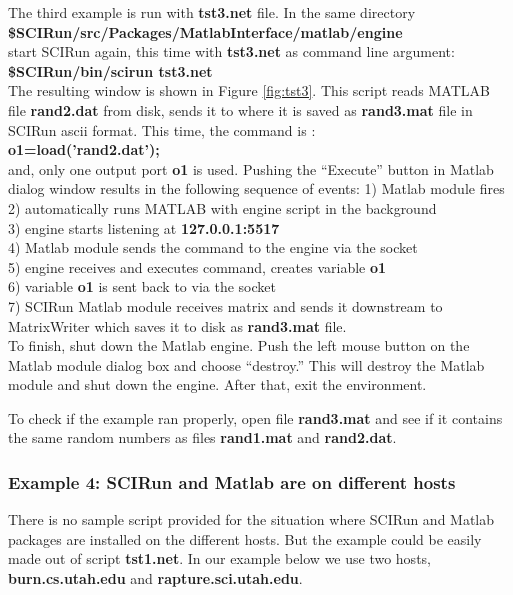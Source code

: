 The third example is run with {\bf tst3.net} file. In the same
directory \\
{\bf \$SCIRun/src/Packages/MatlabInterface/matlab/engine } \\
start SCIRun again, this time with {\bf tst3.net} as command line argument: \\
{\bf \$SCIRun/bin/scirun  tst3.net} \\
The resulting window is shown in Figure \ref{fig:tst3}. This
script reads MATLAB file {\bf rand2.dat} from disk, sends
it to \sr{} where it is saved as {\bf rand3.mat} file
in SCIRun ascii format. This time, the command is : \\
{\bf o1=load('rand2.dat');} \\
and, only one output port {\bf o1} is used. Pushing the
``Execute'' button in Matlab dialog window results in
the following sequence of events:
1) Matlab module fires \\
2) automatically runs MATLAB with engine script in the background  \\
3) engine starts listening at {\bf 127.0.0.1:5517} \\
4) Matlab module sends the command to the engine via the socket\\
5) engine receives and executes command, creates variable {\bf o1} \\
6) variable {\bf o1} is sent back to \sr{} via the socket \\
7) SCIRun Matlab module receives matrix and sends it downstream
   to MatrixWriter which saves it to disk as {\bf rand3.mat} file. \\

To finish, shut down the Matlab engine.
Push the left mouse button on the
Matlab module dialog box and choose ``destroy.'' This will destroy
the Matlab module and shut down the engine. After that, exit
the \sr{} environment.

To check if the example ran properly, open file {\bf rand3.mat}
and see if it contains the same random numbers as files {\bf rand1.mat}
and {\bf rand2.dat}.

\subsubsection{Example 4: SCIRun and Matlab are on different hosts} \indent

There is no sample script provided for the situation where SCIRun and
Matlab packages are installed on the different hosts. But the example
could be easily made out of script {\bf tst1.net}.  In our example
below we use two hosts, {\bf burn.cs.utah.edu} and
{\bf rapture.sci.utah.edu}.

